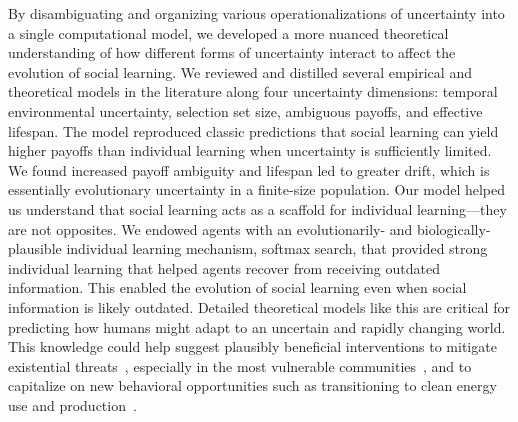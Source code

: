 \documentclass[letterpaper,11.5pt]{scrartcl}
\begin{document}
By disambiguating and organizing various operationalizations of uncertainty
into a single computational model, we developed a more nuanced theoretical
understanding of how different forms of uncertainty interact to affect the
evolution of social learning.  We reviewed and distilled several empirical
and theoretical models in the literature along four uncertainty dimensions:
temporal environmental uncertainty, selection set size, ambiguous payoffs, and
effective lifespan.  The model reproduced classic predictions that social
learning can yield higher payoffs than individual learning when uncertainty is
sufficiently limited. We found increased
payoff ambiguity and lifespan led to greater drift, which is essentially
evolutionary uncertainty in a finite-size population. 
Our model helped us understand that social
learning acts as a scaffold for individual learning---they are not opposites. 
We endowed agents
with an evolutionarily- and biologically-plausible individual learning
mechanism, softmax search, that provided strong individual
learning that helped agents recover
from receiving outdated information. This enabled the evolution of social learning 
even when social information is likely outdated. 
Detailed theoretical
models like this are critical for predicting how humans might adapt to an 
uncertain and rapidly changing world.
This knowledge could help suggest plausibly beneficial interventions to mitigate 
existential threats~\cite{Moya2020,Jones2021}, especially in
the most vulnerable communities~\cite{McNamara2020}, and to capitalize on new
behavioral opportunities such as transitioning to clean energy use and
production~\cite{NatureEnergyEditorialPromisesPremises2018,Brisbois2022}.
\end{document}
